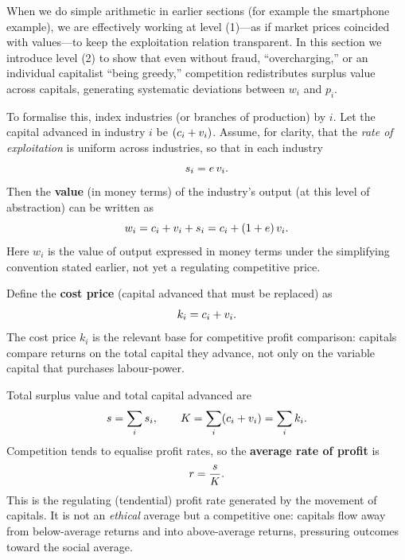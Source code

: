 When we do simple arithmetic in earlier sections (for example the smartphone example), we are effectively working at level (1)---as if market prices coincided with values---to keep the exploitation relation transparent.
In this section we introduce level (2) to show that even without fraud, ``overcharging,'' or an individual capitalist ``being greedy,''
competition redistributes surplus value across capitals, generating systematic deviations between $w_i$ and $p_i$.

To formalise this, index industries (or branches of production) by $i$.
Let the capital advanced in industry $i$ be $(c_i + v_i)$.
Assume, for clarity, that the \emph{rate of exploitation} is uniform across industries,
so that in each industry
\[
  s_i = e\,v_i.
\]
Then the \textbf{value} (in money terms) of the industry's output (at this level of abstraction)
can be written as
\begin{equation}
  w_i = c_i + v_i + s_i
      = c_i + (1+e)\,v_i.
  \label{eq:value-output-industry}
\end{equation}
Here $w_i$ is the value of output expressed in money terms under the simplifying
convention stated earlier, not yet a regulating competitive price.

Define the \textbf{cost price} (capital advanced that must be replaced) as
\begin{equation}
  k_i = c_i + v_i.
  \label{eq:cost-price}
\end{equation}
The cost price $k_i$ is the relevant base for competitive profit comparison: capitals compare returns on the total capital they advance,
not only on the variable capital that purchases labour-power.

Total surplus value and total capital advanced are
\[
  s = \sum_i s_i,
  \qquad
  K = \sum_i (c_i + v_i) = \sum_i k_i.
\]
Competition tends to equalise profit rates, so the \textbf{average rate of profit} is
\begin{equation}
  r = \frac{s}{K}.
  \label{eq:average-profit-rate}
\end{equation}
This is the regulating (tendential) profit rate generated by the movement of capitals.
It is not an \emph{ethical} average but a competitive one: capitals flow away from below-average returns and into above-average returns,
pressuring outcomes toward the social average.

